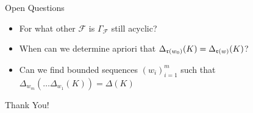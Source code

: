 \documentclass[9pt]{beamer}
\begin{document}

\begin{frame}[fragile]{Open Questions}

  \begin{itemize}
  \item For what other $\mathcal{F}$ is $\Gamma_{\mathcal{F}}$ still acyclic?
  \item When can we determine apriori that $\Delta_{{\mathfrak r}(w_0)}(K) = \Delta_{{\mathfrak r}(w)}(K)$?
  \item  Can we find bounded sequences $(w_i)_{i =1}^m$ such that  $\Delta_{w_m}(\dots \Delta_{w_1}(K)) = \Delta(K)$
  \end{itemize}

  \pause
  \vspace{8mm}
  \begin{center}
    Thank You!
  \end{center}


\end{frame}




\end{document}
